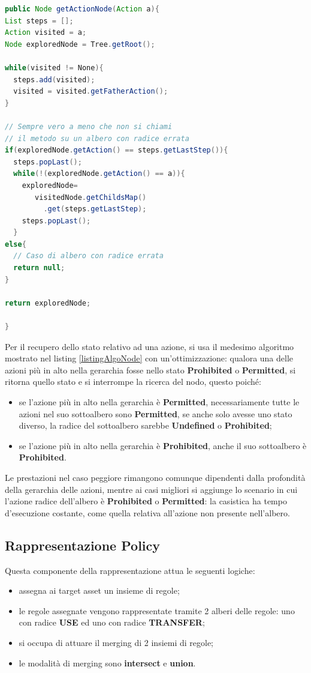 \documentclass[12pt,a4paper,twoside]{book}
\begin{document}
\begin{lstlisting}[language=java,firstnumber=1,caption={Il caso peggiore per questa ricerca è la profondità della gerarchia delle azioni. Il caso migliore si ha qundo l'azione non è nell'albero, con tempo di risposta costante.},label=listingAlgoNode,captionpos=b]
public Node getActionNode(Action a){
List steps = [];
Action visited = a;
Node exploredNode = Tree.getRoot();

while(visited != None){
  steps.add(visited);
  visited = visited.getFatherAction();
}

// Sempre vero a meno che non si chiami
// il metodo su un albero con radice errata
if(exploredNode.getAction() == steps.getLastStep()){
  steps.popLast();
  while(!(exploredNode.getAction() == a)){
  	exploredNode=
  	   visitedNode.getChildsMap()
  	     .get(steps.getLastStep);
  	steps.popLast();
  }
else{
  // Caso di albero con radice errata
  return null; 
}

return exploredNode;
                
}
\end{lstlisting}
Per il recupero dello stato relativo ad una azione, si usa il medesimo algoritmo mostrato nel listing \ref{listingAlgoNode} con un'ottimizzazione: qualora una delle azioni più in alto nella gerarchia fosse nello stato \textbf{Prohibited} o \textbf{Permitted}, si ritorna quello stato e si interrompe la ricerca del nodo, questo poiché:
\begin{itemize}
\item se l'azione più in alto nella gerarchia è \textbf{Permitted}, necessariamente tutte le azioni nel suo sottoalbero sono \textbf{Permitted}, se anche solo avesse uno stato diverso, la radice del sottoalbero sarebbe \textbf{Undefined} o \textbf{Prohibited};
\item  se l'azione più in alto nella gerarchia è \textbf{Prohibited}, anche il suo sottoalbero è \textbf{Prohibited}.
\end{itemize}
Le prestazioni nel caso peggiore rimangono comunque dipendenti dalla profondità della gerarchia delle azioni, mentre ai casi migliori si aggiunge lo scenario in cui l'azione radice dell'albero è \textbf{Prohibited} o \textbf{Permitted}: la casistica ha tempo d'esecuzione costante, come quella relativa all'azione non presente nell'albero.
\subsection{Rappresentazione Policy}\label{policyRappr}
Questa componente della rappresentazione attua le seguenti logiche:
\begin{itemize}
\item assegna ai target asset un insieme di regole;
\item le regole assegnate vengono rappresentate tramite 2 alberi delle regole: uno con radice \textbf{USE} ed uno con radice \textbf{TRANSFER};
\item si occupa di attuare il merging di 2 insiemi di regole;
\item le modalità di merging sono \textbf{intersect} e \textbf{union}.
\end{itemize}
\end{document}
